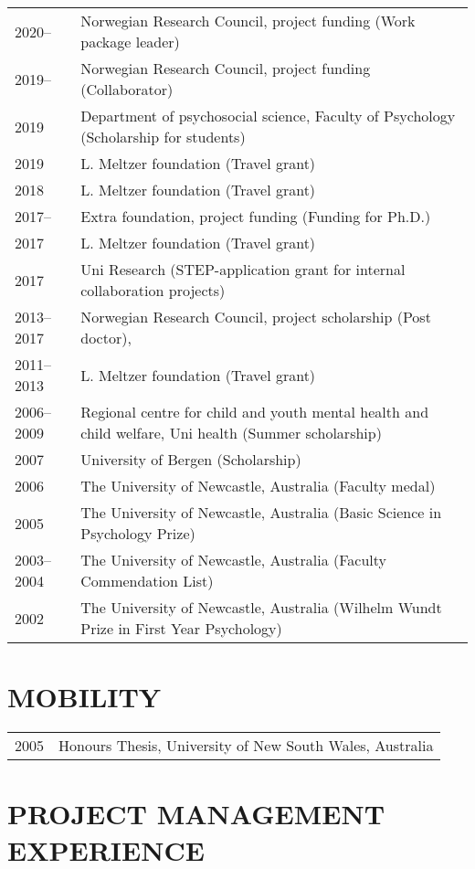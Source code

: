 \documentclass[11pt,a4paper,a4paper]{article}
\begin{document}
\begin{tabular}{ll}
  2020-- & Norwegian Research Council, project funding (Work package leader) \\ 
  2019-- & Norwegian Research Council, project funding (Collaborator) \\ 
  2019 & Department of psychosocial science, Faculty of Psychology (Scholarship for students) \\ 
  2019 & L. Meltzer foundation (Travel grant) \\ 
  2018 & L. Meltzer foundation (Travel grant) \\ 
  2017-- & Extra foundation, project funding (Funding for Ph.D.)  \\ 
  2017 & L. Meltzer foundation (Travel grant) \\ 
  2017 & Uni Research (STEP-application grant for internal collaboration projects) \\ 
  2013--2017 & Norwegian Research Council, project scholarship (Post doctor),  \\ 
  2011--2013 & L. Meltzer foundation (Travel grant) \\ 
  2006--2009 & Regional centre for child and youth mental health and child welfare, Uni health (Summer scholarship) \\ 
  2007 & University of Bergen (Scholarship) \\ 
  2006 & The University of Newcastle, Australia (Faculty medal) \\ 
  2005 & The University of Newcastle, Australia (Basic Science in Psychology Prize) \\ 
  2003--2004 & The University of Newcastle, Australia (Faculty Commendation List) \\ 
  2002 & The University of Newcastle, Australia (Wilhelm Wundt Prize in First Year Psychology) \\ 
  \end{tabular}

\hypertarget{mobility}{%
\section{MOBILITY}\label{mobility}}

\begin{tabular}{ll}
  2005 & Honours Thesis, University of New South Wales, Australia \\ 
  \end{tabular}

\hypertarget{project-management-experience}{%
\section{PROJECT MANAGEMENT EXPERIENCE}\label{project-management-experience}}
\end{document}
